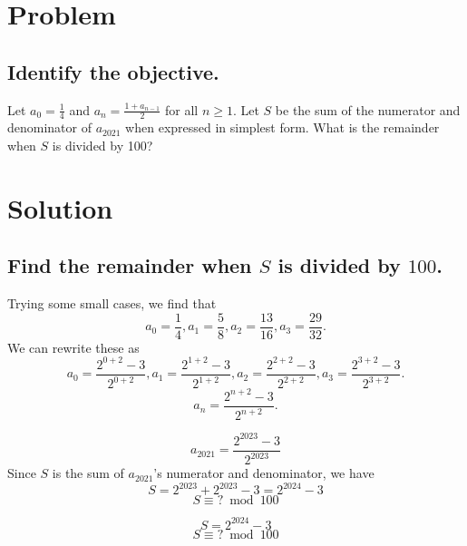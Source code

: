 \documentclass{beamer} %
\begin{document}
\begin{frame} %
  \titlepage
\end{frame}

\section{Problem}

\subsection*{Identify the objective.}

\begin{frame}
  Let $ a_0 = \frac{1}{4} $ and $ a_n = \frac{1 + a_{n-1}}{2} $ for all $n \ge 1$. Let $ S $ be the sum of the numerator and denominator of $ a_{2021} $ when expressed in simplest form. What is the remainder when $ S $ is divided by 100?
\end{frame}

\section{Solution}

\subsection*{Find the remainder when \texorpdfstring{$S$}{S} is divided by \texorpdfstring{$100$}{100}.}

\begin{frame}
  Trying some small cases, we find that
  \[a_0 = \frac{1}{4}, a_1 = \frac{5}{8}, a_2 = \frac{13}{16}, a_3 = \frac{29}{32}.\]
  We can rewrite these as
  \[a_0 = \frac{2^{0+2}-3}{2^{0+2}}, a_1 = \frac{2^{1+2}-3}{2^{1+2}}, a_2 = \frac{2^{2+2}-3}{2^{2+2}}, a_3 = \frac{2^{3+2}-3}{2^{3+2}}.\]
  \[a_n = \frac{2^{n+2}-3}{2^{n+2}}.\]
\end{frame}

\begin{frame}
  \[a_{2021} = \frac{2^{2023}-3}{2^{2023}}\]
  Since $S$ is the sum of $a_{2021}$'s numerator and denominator, we have
  \[S = 2^{2023} + 2^{2023}-3 = 2^{2024} - 3\]
  \[S \equiv \text{?} \bmod 100\]
\end{frame}

\begin{frame}
  \[S = 2^{2024} - 3\]
  \[S \equiv \text{?} \bmod 100\]
\end{frame}
\end{document}
